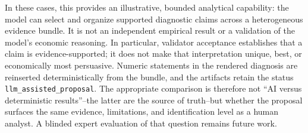 In these cases, this provides an illustrative, bounded analytical capability:
the model can select and organize supported diagnostic claims across a
heterogeneous evidence bundle. It is not an independent empirical result or a
validation of the model's economic reasoning. In particular, validator
acceptance establishes that a claim is evidence-supported; it does not make
that interpretation unique, best, or economically most persuasive. Numeric
statements in the rendered diagnosis are reinserted deterministically from
the bundle, and the artifacts retain the status
\texttt{llm\_assisted\_proposal}. The appropriate comparison is therefore
not ``AI versus deterministic results''--the latter are the source of
truth--but whether the proposal surfaces the same evidence, limitations, and
identification level as a human analyst. A blinded expert evaluation of that
question remains future work.
